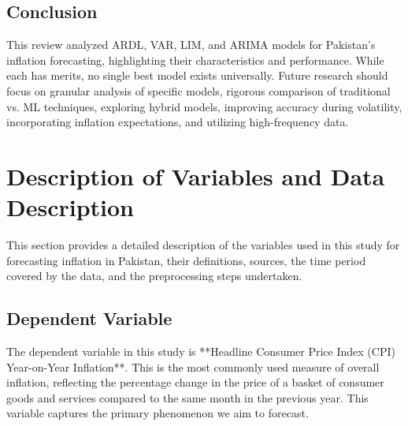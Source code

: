 \documentclass[12pt,a4paper]{article}
\begin{document}
\subsection{Conclusion}
This review analyzed ARDL, VAR, LIM, and ARIMA models for Pakistan's inflation forecasting, highlighting their characteristics and performance. While each has merits, no single best model exists universally. Future research should focus on granular analysis of specific models, rigorous comparison of traditional vs. ML techniques, exploring hybrid models, improving accuracy during volatility, incorporating inflation expectations, and utilizing high-frequency data.

\section{Description of Variables and Data Description}

This section provides a detailed description of the variables used in this study for forecasting inflation in Pakistan, their definitions, sources, the time period covered by the data, and the preprocessing steps undertaken.

\subsection{Dependent Variable}
The dependent variable in this study is **Headline Consumer Price Index (CPI) Year-on-Year Inflation**. This is the most commonly used measure of overall inflation, reflecting the percentage change in the price of a basket of consumer goods and services compared to the same month in the previous year. This variable captures the primary phenomenon we aim to forecast.
\end{document}
